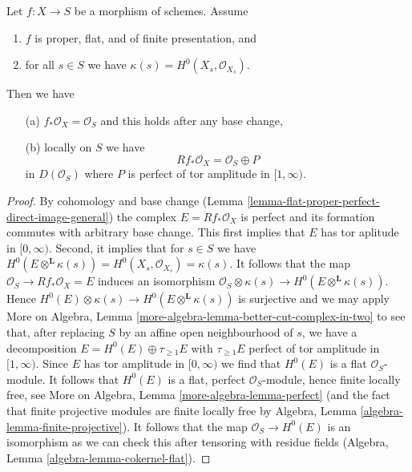 \begin{lemma}
\label{lemma-proper-flat-h0}
Let $f : X \to S$ be a morphism of schemes. Assume
\begin{enumerate}
\item $f$ is proper, flat, and of finite presentation, and
\item for all $s \in S$ we have $\kappa(s) = H^0(X_s, \mathcal{O}_{X_s})$.
\end{enumerate}
Then we have
\begin{enumerate}
\item[(a)] $f_*\mathcal{O}_X = \mathcal{O}_S$ and
this holds after any base change,
\item[(b)] locally on $S$ we have
$$
Rf_*\mathcal{O}_X = \mathcal{O}_S \oplus P
$$
in $D(\mathcal{O}_S)$
where $P$ is perfect of tor amplitude in $[1, \infty)$.
\end{enumerate}
\end{lemma}

\begin{proof}
By cohomology and base change
(Lemma \ref{lemma-flat-proper-perfect-direct-image-general})
the complex $E = Rf_*\mathcal{O}_X$
is perfect and its formation commutes with arbitrary base change.
This first implies that $E$ has tor aplitude in $[0, \infty)$.
Second, it implies that for $s \in S$ we have
$H^0(E \otimes^\mathbf{L} \kappa(s)) =
H^0(X_s, \mathcal{O}_{X_s}) = \kappa(s)$.
It follows that the map $\mathcal{O}_S \to Rf_*\mathcal{O}_X = E$
induces an isomorphism
$\mathcal{O}_S \otimes \kappa(s) \to H^0(E \otimes^\mathbf{L} \kappa(s))$.
Hence $H^0(E) \otimes \kappa(s) \to H^0(E \otimes^\mathbf{L} \kappa(s))$
is surjective and we may apply
More on Algebra, Lemma \ref{more-algebra-lemma-better-cut-complex-in-two}
to see that, after replacing $S$ by an affine open neighbourhood of $s$,
we have a decomposition $E = H^0(E) \oplus \tau_{\geq 1}E$
with $\tau_{\geq 1}E$ perfect of tor amplitude in $[1, \infty)$.
Since $E$ has tor amplitude in $[0, \infty)$ we find that
$H^0(E)$ is a flat $\mathcal{O}_S$-module.
It follows that $H^0(E)$ is a flat, perfect $\mathcal{O}_S$-module,
hence finite locally free, see
More on Algebra, Lemma \ref{more-algebra-lemma-perfect}
(and the fact that finite projective modules are finite locally free by
Algebra, Lemma \ref{algebra-lemma-finite-projective}).
It follows that the map $\mathcal{O}_S \to H^0(E)$ is
an isomorphism as we can check this after tensoring with
residue fields (Algebra, Lemma \ref{algebra-lemma-cokernel-flat}).
\end{proof}

